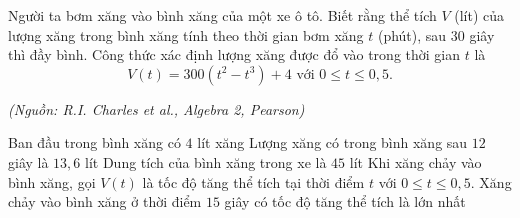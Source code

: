 \begin{ex}%

	Người ta bơm xăng vào bình xăng của một xe ô tô. Biết rằng thể tích $V$ (lít) của lượng xăng trong bình xăng tính theo thời gian bơm xăng $t$ (phút), sau $30$ giây thì đầy bình. Công thức xác định lượng xăng được đổ vào trong thời gian $t$ là $$V(t)=300(t^2-t^3)+4 \text{ với } 0\le t\le 0{,}5.$$
	\begin{flushright}
		\textit{(Nguồn: R.I. Charles et al., Algebra 2, Pearson)}
	\end{flushright}
	\choiceTF
	{\True Ban đầu trong bình xăng có $4$ lít xăng}
	{\True Lượng xăng có trong bình xăng sau $12$ giây là $13{,}6$ lít}
	{Dung tích của bình xăng trong xe là $45$ lít}
	{Khi xăng chảy vào bình xăng, gọi $V(t)$ là tốc độ tăng thể tích tại thời điểm $t$ với $0\le t\le 0{,}5$. Xăng chảy vào bình xăng ở thời điểm $15$ giây có tốc độ tăng thể tích là lớn nhất}
\end{ex}

